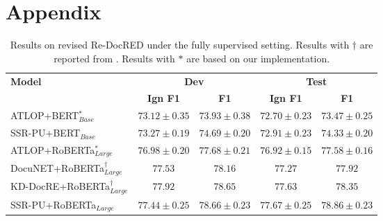 \documentclass[11pt]{article}
\begin{document}
\appendix

\section{Appendix}
\label{sec:appendix}

\begin{table*}
\centering
\begin{tabular}{lcccc}
\hline \textbf{Model} & \multicolumn{2}{c}{\textbf{Dev}} & \multicolumn{2}{c}{\textbf{Test}} \\
& \textbf{Ign F1} & \textbf{F1} & \textbf{Ign F1} & \textbf{F1} \\
\hline ATLOP+BERT$_{Base}^{\ast}$ & $73.12 \pm 0.35$ & $73.93 \pm 0.38$ & $72.70 \pm 0.23$ & $73.47 \pm 0.25$ \\
SSR-PU+BERT$_{Base}$ & $\mathbf{73.27} \pm \mathbf{0.19}$ & $\mathbf{74.69} \pm \mathbf{0.20}$ & $\mathbf{72.91} \pm \mathbf{0.23}$ & $\mathbf{74.33} \pm \mathbf{0.20}$ \\
\hline ATLOP+RoBERTa$_{Large}^{\ast}$ & $76.98 \pm 0.20$ & $77.68 \pm 0.21$ & $76.92 \pm 0.15$ & $77.58 \pm 0.16$ \\
DocuNET+RoBERTa$_{Large}^{\dagger}$ & $77.53$ & $78.16$ & $77.27$ & $77.92$ \\
KD-DocRE+RoBERTa$_{Large}^{\dagger}$ & $\mathbf{77.92}$ & $78.65$ & $77.63$ & $78.35$ \\
SSR-PU+RoBERTa$_{Large}$ & $77.44 \pm 0.25$ & $\mathbf{78.66} \pm \mathbf{0.23}$ & $\mathbf{77.67} \pm \mathbf{0.25}$ & $\mathbf{78.86} \pm \mathbf{0.23}$ \\
\hline
\end{tabular}
\caption{\label{table_full}
Results on revised Re-DocRED under the fully supervised setting. Results with $\dagger$ are reported from \citep{tan2022revisiting}. Results with $\ast$ are based on our implementation.
}
\end{table*}
\end{document}
